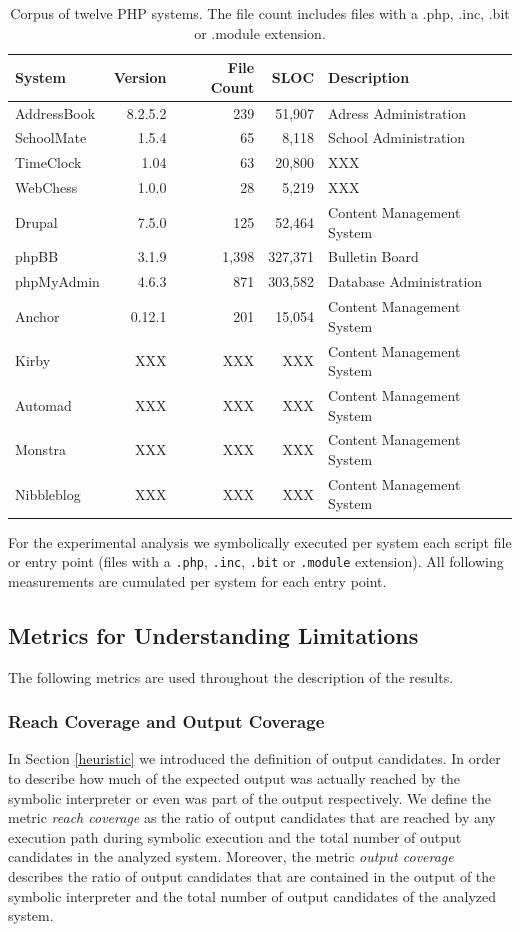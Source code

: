 \documentclass{sig-alternate-05-2015}
\begin{document}
\begin{table}[t]
\centering 
	\begin{tabular}{p{4cm}rrrl}
	\toprule
	\textbf{System} & \textbf{Version} & \textbf{File Count} & \textbf{SLOC} &
	\textbf{Description}
	\\
	\midrule
	AddressBook & 8.2.5.2 & 239 & 51,907 & Adress Administration \\
	SchoolMate & 1.5.4 & 65 & 8,118 & School Administration \\
	TimeClock & 1.04 & 63 & 20,800 & XXX \\
	WebChess & 1.0.0 & 28 & 5,219 & XXX \\
	\midrule
	Drupal & 7.5.0 & 125 & 52,464 & Content Management System \\
	phpBB & 3.1.9 & 1,398 & 327,371 & Bulletin Board \\
	phpMyAdmin & 4.6.3 & 871 & 303,582 & Database Administration \\
	\midrule
	Anchor & 0.12.1 & 201 & 15,054 & Content Management System \\
	Kirby & XXX & XXX & XXX & Content Management System \\
	Automad & XXX & XXX & XXX & Content Management System \\
	Monstra & XXX & XXX & XXX & Content Management System \\
	Nibbleblog & XXX & XXX & XXX & Content Management System \\
	\bottomrule
	\end{tabular}
	\caption{Corpus of twelve PHP systems. The file count includes files with a .php,
	.inc, .bit or .module extension.}
	\label{corpus}
\end{table}

For the experimental analysis we symbolically executed per system each script file or entry point (files with a \texttt{.php}, \texttt{.inc}, \texttt{.bit} or \texttt{.module} extension). All following measurements are cumulated per system for each entry point. 

\subsection{Metrics for Understanding Limitations} \label{metrics}
The following metrics are used throughout the description of the results. 

\subsubsection{Reach Coverage and Output Coverage} \label{coverage_section}
In Section \ref{heuristic} we introduced the definition of output candidates. In
order to describe how much of the expected output was actually reached by the
symbolic interpreter or even was part of the output respectively.
We define the metric \emph{reach coverage} as the ratio of output candidates
that are reached by any execution path during symbolic execution and the total
number of output candidates in the analyzed system. Moreover, the metric \emph{output coverage} describes the ratio of output
candidates that are contained in the output of the symbolic interpreter and the total
number of output candidates of the analyzed system. 
\end{document}

